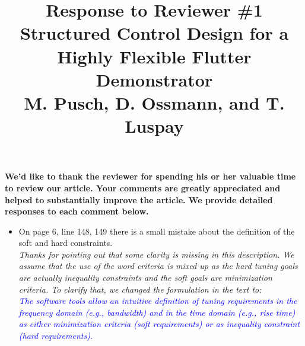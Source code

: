\documentclass{article}
\begin{document}
\title{\textsf{Response to Reviewer \#1 } \\ [+2mm]  \small{Structured Control Design for a Highly Flexible Flutter Demonstrator}
\\ [+2mm]
M. Pusch, D. Ossmann, and T. Luspay}

\date{}
\maketitle

\textbf{We'd like to  thank the reviewer for spending his or her valuable time to review our article. Your comments are greatly appreciated and helped to substantially improve the article. We provide detailed responses to each comment below.}



\begin{itemize}




\item On page 6, line 148, 149 there is a small mistake about the definition of the soft and hard constraints.\\
\textit{Thanks for pointing out that some clarity is missing in this description. We assume that the use of the word \textnormal{criteria} is mixed up as the hard tuning goals are actually inequality constraints and the soft goals are minimization criteria. To clarify that, we changed the formulation in the text to: \\
\textcolor{blue}{
The software tools allow an intuitive definition of tuning requirements in the frequency domain (e.g., bandwidth) and in the time domain (e.g., rise time)  as either minimization criteria (soft requirements) or as inequality constraint (hard requirements).
}}



\end{itemize}
\end{document}
